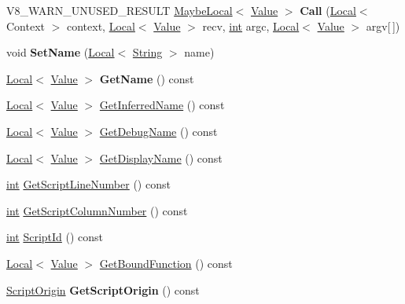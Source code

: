 \begin{DoxyCompactItemize}
\item 
\mbox{\label{classv8_1_1Function_a8ba77d12e5716e451b32a79459cc75dd}} 
V8\+\_\+\+W\+A\+R\+N\+\_\+\+U\+N\+U\+S\+E\+D\+\_\+\+R\+E\+S\+U\+LT \mbox{\hyperlink{classv8_1_1MaybeLocal}{Maybe\+Local}}$<$ \mbox{\hyperlink{classv8_1_1Value}{Value}} $>$ {\bfseries Call} (\mbox{\hyperlink{classv8_1_1Local}{Local}}$<$ Context $>$ context, \mbox{\hyperlink{classv8_1_1Local}{Local}}$<$ \mbox{\hyperlink{classv8_1_1Value}{Value}} $>$ recv, \mbox{\hyperlink{classint}{int}} argc, \mbox{\hyperlink{classv8_1_1Local}{Local}}$<$ \mbox{\hyperlink{classv8_1_1Value}{Value}} $>$ argv\mbox{[}$\,$\mbox{]})
\item 
\mbox{\label{classv8_1_1Function_aa9f51cea2036e0caa317e3955109856d}} 
void {\bfseries Set\+Name} (\mbox{\hyperlink{classv8_1_1Local}{Local}}$<$ \mbox{\hyperlink{classv8_1_1String}{String}} $>$ name)
\item 
\mbox{\label{classv8_1_1Function_a145a91e74d5adb78c8b710618253b487}} 
\mbox{\hyperlink{classv8_1_1Local}{Local}}$<$ \mbox{\hyperlink{classv8_1_1Value}{Value}} $>$ {\bfseries Get\+Name} () const
\item 
\mbox{\hyperlink{classv8_1_1Local}{Local}}$<$ \mbox{\hyperlink{classv8_1_1Value}{Value}} $>$ \mbox{\hyperlink{classv8_1_1Function_a3c6402a488df8b43ae5c38587fa6989a}{Get\+Inferred\+Name}} () const
\item 
\mbox{\hyperlink{classv8_1_1Local}{Local}}$<$ \mbox{\hyperlink{classv8_1_1Value}{Value}} $>$ \mbox{\hyperlink{classv8_1_1Function_af2792776825eb0016b0a855dbcb6c5ff}{Get\+Debug\+Name}} () const
\item 
\mbox{\hyperlink{classv8_1_1Local}{Local}}$<$ \mbox{\hyperlink{classv8_1_1Value}{Value}} $>$ \mbox{\hyperlink{classv8_1_1Function_a4266e0c48da5fd6ba4fd6b759e5f53f3}{Get\+Display\+Name}} () const
\item 
\mbox{\hyperlink{classint}{int}} \mbox{\hyperlink{classv8_1_1Function_a616f966e538ec32182acd4acb7ee70bc}{Get\+Script\+Line\+Number}} () const
\item 
\mbox{\hyperlink{classint}{int}} \mbox{\hyperlink{classv8_1_1Function_a87bc63f97a9a39f83051570519fc63c2}{Get\+Script\+Column\+Number}} () const
\item 
\mbox{\hyperlink{classint}{int}} \mbox{\hyperlink{classv8_1_1Function_a5070c2657325ed6ca05ebb932c641438}{Script\+Id}} () const
\item 
\mbox{\hyperlink{classv8_1_1Local}{Local}}$<$ \mbox{\hyperlink{classv8_1_1Value}{Value}} $>$ \mbox{\hyperlink{classv8_1_1Function_ac3b4ea43e40fedfa17e871bdfbb9517e}{Get\+Bound\+Function}} () const
\item 
\mbox{\label{classv8_1_1Function_a79197c4c905cd1fb905f242c3d1d31cf}} 
\mbox{\hyperlink{classv8_1_1ScriptOrigin}{Script\+Origin}} {\bfseries Get\+Script\+Origin} () const
\end{DoxyCompactItemize}
